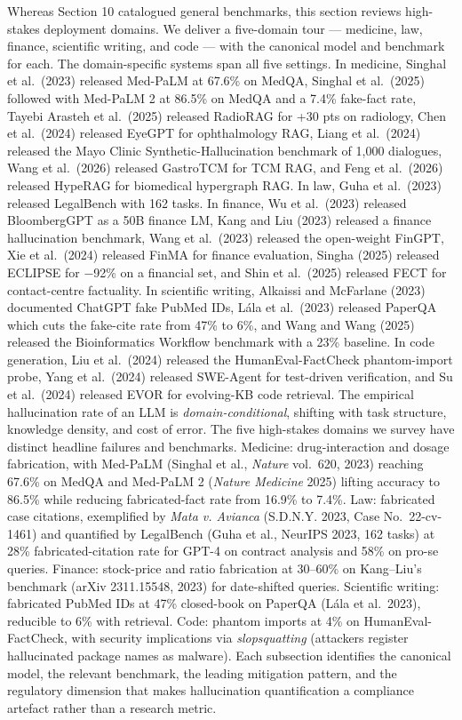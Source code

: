 Whereas Section 10 catalogued general benchmarks, this section reviews high-stakes deployment domains. We deliver a five-domain tour --- medicine, law, finance, scientific writing, and code --- with the canonical model and benchmark for each. The domain-specific systems span all five settings. In medicine, Singhal et al.~(2023) released Med-PaLM at 67.6\% on MedQA, Singhal et al.~(2025) followed with Med-PaLM 2 at 86.5\% on MedQA and a 7.4\% fake-fact rate, Tayebi Arasteh et al.~(2025) released RadioRAG for +30 pts on radiology, Chen et al.~(2024) released EyeGPT for ophthalmology RAG, Liang et al.~(2024) released the Mayo Clinic Synthetic-Hallucination benchmark of 1,000 dialogues, Wang et al.~(2026) released GastroTCM for TCM RAG, and Feng et al.~(2026) released HypeRAG for biomedical hypergraph RAG. In law, Guha et al.~(2023) released LegalBench with 162 tasks. In finance, Wu et al.~(2023) released BloombergGPT as a 50B finance LM, Kang and Liu (2023) released a finance hallucination benchmark, Wang et al.~(2023) released the open-weight FinGPT, Xie et al.~(2024) released FinMA for finance evaluation, Singha (2025) released ECLIPSE for −92\% on a financial set, and Shin et al.~(2025) released FECT for contact-centre factuality. In scientific writing, Alkaissi and McFarlane (2023) documented ChatGPT fake PubMed IDs, Lála et al.~(2023) released PaperQA which cuts the fake-cite rate from 47\% to 6\%, and Wang and Wang (2025) released the Bioinformatics Workflow benchmark with a 23\% baseline. In code generation, Liu et al.~(2024) released the HumanEval-FactCheck phantom-import probe, Yang et al.~(2024) released SWE-Agent for test-driven verification, and Su et al.~(2024) released EVOR for evolving-KB code retrieval. The empirical hallucination rate of an LLM is \emph{domain-conditional}, shifting with task structure, knowledge density, and cost of error. The five high-stakes domains we survey have distinct headline failures and benchmarks. Medicine: drug-interaction and dosage fabrication, with Med-PaLM (Singhal et al., \emph{Nature} vol.~620, 2023) reaching 67.6\% on MedQA and Med-PaLM 2 (\emph{Nature Medicine} 2025) lifting accuracy to 86.5\% while reducing fabricated-fact rate from 16.9\% to 7.4\%. Law: fabricated case citations, exemplified by \emph{Mata v. Avianca} (S.D.N.Y. 2023, Case No.~22-cv-1461) and quantified by LegalBench (Guha et al., NeurIPS 2023, 162 tasks) at 28\% fabricated-citation rate for GPT-4 on contract analysis and 58\% on pro-se queries. Finance: stock-price and ratio fabrication at 30--60\% on Kang--Liu's benchmark (arXiv 2311.15548, 2023) for date-shifted queries. Scientific writing: fabricated PubMed IDs at 47\% closed-book on PaperQA (Lála et al.~2023), reducible to 6\% with retrieval. Code: phantom imports at 4\% on HumanEval-FactCheck, with security implications via \emph{slopsquatting} (attackers register hallucinated package names as malware). Each subsection identifies the canonical model, the relevant benchmark, the leading mitigation pattern, and the regulatory dimension that makes hallucination quantification a compliance artefact rather than a research metric.

